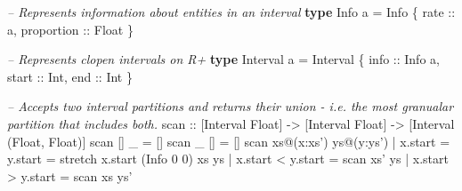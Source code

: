 \documentclass[]{article}
\newenvironment{Shaded}{}{}
\newcommand{\CommentTok}[1]{\textcolor[rgb]{0.38,0.63,0.69}{\textit{#1}}}
\newcommand{\DataTypeTok}[1]{\textcolor[rgb]{0.56,0.13,0.00}{#1}}
\newcommand{\DecValTok}[1]{\textcolor[rgb]{0.25,0.63,0.44}{#1}}
\newcommand{\KeywordTok}[1]{\textcolor[rgb]{0.00,0.44,0.13}{\textbf{#1}}}
\newcommand{\NormalTok}[1]{#1}
\newcommand{\OperatorTok}[1]{\textcolor[rgb]{0.40,0.40,0.40}{#1}}
\newcommand{\OtherTok}[1]{\textcolor[rgb]{0.00,0.44,0.13}{#1}}
\begin{document}
\begin{Shaded}
\begin{Highlighting}[]
\CommentTok{-- Represents information about entities in an interval}
\KeywordTok{type} \DataTypeTok{Info}\NormalTok{ a }\OtherTok{=} \DataTypeTok{Info}\NormalTok{ \{}
\OtherTok{  rate       ::}\NormalTok{ a,}
\OtherTok{  proportion ::} \DataTypeTok{Float}
\NormalTok{\}}

\CommentTok{-- Represents clopen intervals on R+}
\KeywordTok{type} \DataTypeTok{Interval}\NormalTok{ a }\OtherTok{=} \DataTypeTok{Interval}\NormalTok{ \{}
\OtherTok{  info  ::} \DataTypeTok{Info}\NormalTok{ a,}
\OtherTok{  start ::} \DataTypeTok{Int}\NormalTok{,}
\OtherTok{  end   ::} \DataTypeTok{Int}
\NormalTok{\}}

\CommentTok{-- Accepts two interval partitions and returns their union - i.e. the most granualar partition that includes both.}
\OtherTok{scan ::}\NormalTok{ [}\DataTypeTok{Interval} \DataTypeTok{Float}\NormalTok{] }\OtherTok{->}\NormalTok{ [}\DataTypeTok{Interval} \DataTypeTok{Float}\NormalTok{] }\OtherTok{->}\NormalTok{ [}\DataTypeTok{Interval}\NormalTok{ (}\DataTypeTok{Float}\NormalTok{, }\DataTypeTok{Float}\NormalTok{)]}
\NormalTok{scan [] _ }\OtherTok{=}\NormalTok{ []}
\NormalTok{scan _ [] }\OtherTok{=}\NormalTok{ []}
\NormalTok{scan xs}\OperatorTok{@}\NormalTok{(x}\OperatorTok{:}\NormalTok{xs') ys}\OperatorTok{@}\NormalTok{(y}\OperatorTok{:}\NormalTok{ys')}
  \OperatorTok{|}\NormalTok{ x}\OperatorTok{.}\NormalTok{start }\OtherTok{=}\NormalTok{ y}\OperatorTok{.}\NormalTok{start }\OtherTok{=}\NormalTok{ stretch x}\OperatorTok{.}\NormalTok{start (}\DataTypeTok{Info} \DecValTok{0} \DecValTok{0}\NormalTok{) xs ys}
  \OperatorTok{|}\NormalTok{ x}\OperatorTok{.}\NormalTok{start }\OperatorTok{<}\NormalTok{ y}\OperatorTok{.}\NormalTok{start }\OtherTok{=}\NormalTok{ scan xs' ys}
  \OperatorTok{|}\NormalTok{ x}\OperatorTok{.}\NormalTok{start }\OperatorTok{>}\NormalTok{ y}\OperatorTok{.}\NormalTok{start }\OtherTok{=}\NormalTok{ scan xs ys'}


\end{Highlighting}
\end{Shaded}
\end{document}

